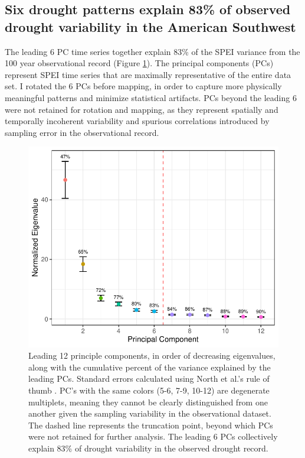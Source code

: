 \documentclass[10pt]{iopart}
\begin{document}
\subsection*{Six drought patterns explain 83\% of observed drought variability in the American Southwest}
The leading 6 PC time series together explain 83\% of the SPEI variance from the 100 year observational record (Figure \ref{fig:scree}). The principal components (PCs) represent SPEI time series that are maximally representative of the entire data set. I rotated the 6 PCs before mapping, in order to capture more physically meaningful patterns and minimize statistical artifacts. PCs beyond the leading 6 were not retained for rotation and mapping, as they represent spatially and temporally incoherent variability and spurious correlations introduced by sampling error in the observational record. 

\begin{figure}[!ht]
\centering
\includegraphics[width=.8\linewidth]{figures/scree.pdf}
\caption{Leading 12 principle components, in order of decreasing eigenvalues, along with the cumulative percent of the variance explained by the leading PCs. Standard errors calculated using North et al.'s rule of thumb \parencite{North1982}. PC's with the same colors (5-6, 7-9, 10-12) are degenerate multiplets, meaning they cannot be clearly distinguished from one another given the sampling variability in the observational dataset. The dashed line represents the truncation point, beyond which PCs were not retained for further analysis. The leading 6 PCs collectively explain 83\% of drought variability in the observed drought record.}
\label{fig:scree}
\end{figure}
\end{document}

